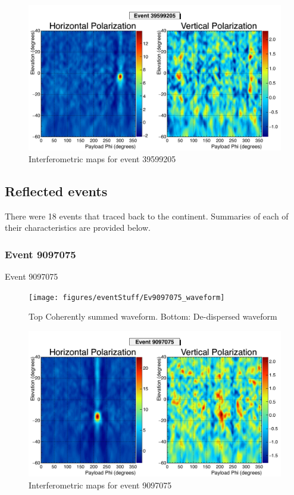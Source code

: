 		\begin{figure}
		\centering
			\includegraphics[width=\textwidth]{figures/intMap/intMap_ev39599205}
			\caption{Interferometric maps for event 39599205} 
		\label{fig:Ev39599205_map}
		\end{figure}				
		
	\subsection{Reflected events}
		There were 18 events that traced back to the continent.  Summaries of each of their characteristics are provided below.
	
		\subsubsection{Event 9097075}
			Event 9097075 
		
		\begin{figure}
		\centering
			\texttt{[image: figures/eventStuff/Ev9097075\_waveform]}
			\caption{Top Coherently summed waveform.  Bottom: De-dispersed waveform} 
		\label{fig:Ev9097075_waveform}
		\end{figure}

		\begin{figure}
		\centering
			\includegraphics[width=\textwidth]{figures/intMap/intMap_ev9097075}
			\caption{Interferometric maps for event 9097075} 
		\label{fig:Ev9097075_map}
		\end{figure}


